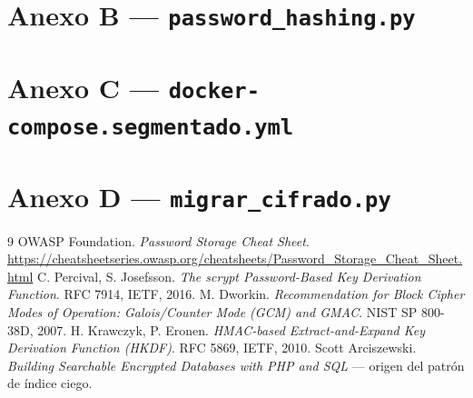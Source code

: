 \documentclass[11pt,letterpaper]{article}
\begin{document}


\newpage
\section*{Anexo B — \texttt{password\_hashing.py}}



\newpage
\section*{Anexo C — \texttt{docker-compose.segmentado.yml}}



\newpage
\section*{Anexo D — \texttt{migrar\_cifrado.py}}



\vspace{1.5em}
\begin{thebibliography}{9}
\small
{} OWASP Foundation. \emph{Password Storage Cheat Sheet}.
  \url{https://cheatsheetseries.owasp.org/cheatsheets/Password_Storage_Cheat_Sheet.html}
 C. Percival, S. Josefsson. \emph{The scrypt Password-Based Key
  Derivation Function}. RFC 7914, IETF, 2016.
 M. Dworkin. \emph{Recommendation for Block Cipher Modes of
  Operation: Galois/Counter Mode (GCM) and GMAC}. NIST SP 800-38D, 2007.
 H. Krawczyk, P. Eronen. \emph{HMAC-based Extract-and-Expand
  Key Derivation Function (HKDF)}. RFC 5869, IETF, 2010.
 Scott Arciszewski. \emph{Building Searchable Encrypted
  Databases with PHP and SQL} — origen del patrón de índice ciego.
\end{thebibliography}
\end{document}
